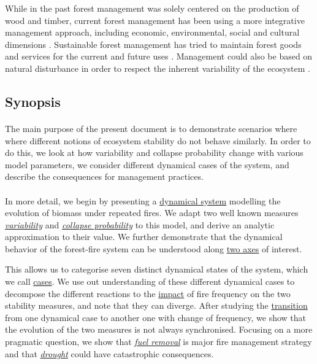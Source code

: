 \documentclass{article}
\begin{document}
While in the past forest management was solely centered on the production of wood and timber, current forest management has been using a more integrative management approach, including economic, environmental, social and cultural dimensions \citep{eggers_balancing_2017, raison2001criteria}. Sustainable forest management has tried to maintain forest goods and services for the current and future uses \citep{macdicken_global_2015}. Management could also be based on natural disturbance in order to respect the inherent variability of the ecosystem \citep{bergeron_natural_2002}.


\newpage

\subsection*{Synopsis}


\paragraph{}
The main purpose of the present document is to demonstrate scenarios where  where different notions of ecosystem stability do not behave similarly. In order to do this, we look at how variability and collapse probability change with various model parameters, we consider different dynamical cases of the system, and describe the consequences for management practices.

\paragraph{}
In more detail, we begin by presenting a \hyperref[dynamical_system]{dynamical system} modelling the evolution of biomass under repeated fires. We adapt two well known measures \hyperref[variability]{\textit{variability}} and \hyperref[collapse_probability]{\textit{collapse probability}} to this model, and derive an analytic approximation to their value. We further demonstrate that the dynamical behavior of the forest-fire system can be understood along \hyperref[axes_definition]{two axes} of interest.

This allows us to categorise seven distinct dynamical states of the system, which we call \hyperref[dyna_cases]{cases}. We use out understanding of these different dynamical cases to decompose the different reactions to the \hyperref[impact_freq]{impact} of fire frequency on the two stability measures, and note that they can diverge. After studying the \hyperref[transition]{transition} from one dynamical case to another one with change of frequency, we show that the evolution of the two measures is not always synchronised. Focusing on a more pragmatic question, we show that \hyperref[fuel_removal]{\textit{fuel removal}} is major fire management strategy and that \hyperref[drought]{\textit{drought}} could have catastrophic consequences.  
\end{document}
